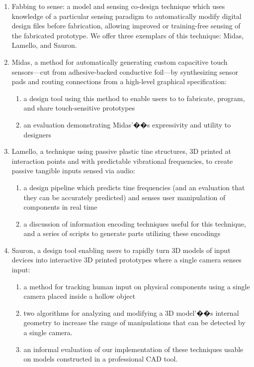 \begin{enumerate}
\item Fabbing to sense: a model and sensing co-design technique which uses knowledge of a particular sensing paradigm to automatically modify digital design files before fabrication, allowing improved or training-free sensing of the fabricated prototype. We offer three exemplars of this technique: Midas, Lamello, and Sauron.
\item Midas, a method for automatically generating custom capacitive touch sensors---cut from adhesive-backed conductive foil---by synthesizing sensor pads and routing connections from a high-level graphical specification:
\begin{enumerate}
    \item a design tool using this method to enable users to to fabricate, program, and share touch-sensitive prototypes
    \item an evaluation demonstrating Midas'��s expressivity and utility to designers
    \end{enumerate}
\item Lamello, a technique using passive plastic tine structures, 3D printed at interaction points and with predictable vibrational frequencies, to create passive tangible inputs sensed via audio:
\begin{enumerate}
    \item a design pipeline which predicts tine frequencies (and an evaluation that they can be accurately predicted) and senses user manipulation of components in real time
    \item a discussion of information encoding techniques useful for this technique, and a series of scripts to generate parts utilizing these encodings
    \end{enumerate}
\item Sauron, a design tool enabling users to rapidly turn 3D models of input devices into interactive 3D printed prototypes where a single camera senses input: %
\begin{enumerate}
    \item a method for tracking human input on physical components using a single camera placed inside a hollow object
    \item two algorithms for analyzing and modifying a 3D model'��s internal geometry to increase the range of manipulations that can be detected by a single camera.
    \item an informal evaluation of our implementation of these techniques usable on models constructed in a professional CAD tool.
    \end{enumerate}
\end{enumerate}